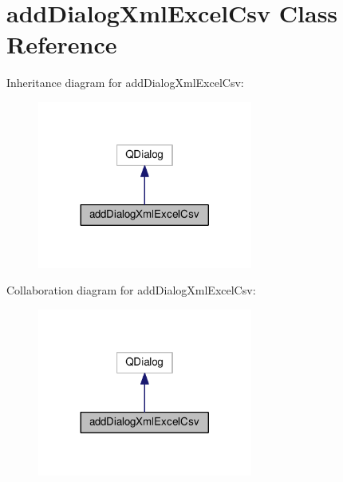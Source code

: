 \hypertarget{classaddDialogXmlExcelCsv}{}\section{add\+Dialog\+Xml\+Excel\+Csv Class Reference}
\label{classaddDialogXmlExcelCsv}


Inheritance diagram for add\+Dialog\+Xml\+Excel\+Csv\+:\nopagebreak
\begin{figure}[H]
\begin{center}
\leavevmode
\includegraphics[width=200pt]{classaddDialogXmlExcelCsv__inherit__graph}
\end{center}
\end{figure}


Collaboration diagram for add\+Dialog\+Xml\+Excel\+Csv\+:\nopagebreak
\begin{figure}[H]
\begin{center}
\leavevmode
\includegraphics[width=200pt]{classaddDialogXmlExcelCsv__coll__graph}
\end{center}
\end{figure}
